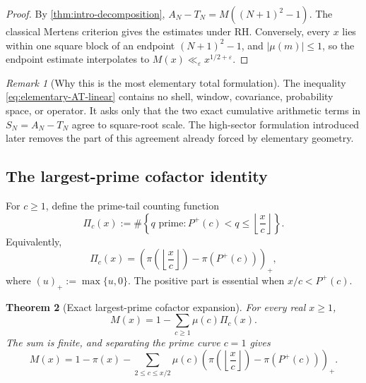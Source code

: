 \documentclass[11pt]{article}
\newtheorem{theorem}{Theorem}[section]
\theoremstyle{definition}
\theoremstyle{remark}
\newtheorem{remark}[theorem]{Remark}
\newcommand{\eps}{\varepsilon}
\newcommand{\Pplus}{P^{+}}
\newcommand{\1}{\mathbf{1}}
\begin{document}
\begin{proof}
By \cref{thm:intro-decomposition}, $A_N-T_N=M((N+1)^2-1)$.  The classical Mertens criterion gives the estimates under RH.  Conversely, every $x$ lies within one square block of an endpoint $(N+1)^2-1$, and $|\mu(m)|\le1$, so the endpoint estimate interpolates to $M(x)\ll_\eps x^{1/2+\eps}$.
\end{proof}

\begin{remark}[Why this is the most elementary total formulation]
The inequality \cref{eq:elementary-AT-linear} contains no shell, window, covariance, probability space, or operator.  It asks only that the two exact cumulative arithmetic terms in $S_N=A_N-T_N$ agree to square-root scale.  The high-sector formulation introduced later removes the part of this agreement already forced by elementary geometry.
\end{remark}


\subsection{The largest-prime cofactor identity}
\label{subsec:central-identity}

For $c\ge1$, define the prime-tail counting function
\begin{equation}
 \Pi_c(x)
 :=
 \#\left\{
 q\text{ prime}:
 \Pplus(c)<q\le\left\lfloor\frac{x}{c}\right\rfloor
 \right\}.
 \label{eq:Pi-c}
\end{equation}
Equivalently,
\begin{equation}
 \Pi_c(x)
 =
 \left(
 \pi\!\left(\left\lfloor\frac{x}{c}\right\rfloor\right)
 -\pi(\Pplus(c))
 \right)_{+},
 \label{eq:Pi-c-positive-part}
\end{equation}
where $(u)_+:=\max\{u,0\}$.  The positive part is essential when
$x/c<\Pplus(c)$.

\begin{theorem}[Exact largest-prime cofactor expansion]
\label{thm:central-M-identity}
For every real $x\ge1$,
\begin{equation}
 \boxed{
 M(x)
 =
 1-\sum_{c\ge1}\mu(c)\Pi_c(x).
 }
 \label{eq:central-M-identity-compact}
\end{equation}
The sum is finite, and separating the prime curve $c=1$ gives
\begin{equation}
 \boxed{
 M(x)
 =
 1-\pi(x)
 -\sum_{2\le c\le x/2}
 \mu(c)
 \left(
 \pi\!\left(\left\lfloor\frac{x}{c}\right\rfloor\right)
 -\pi(\Pplus(c))
 \right)_{+}.
 }
 \label{eq:central-M-identity}
\end{equation}
\end{theorem}
\end{document}
